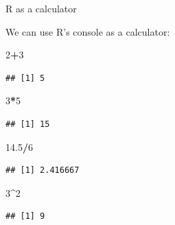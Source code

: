 \documentclass[ignorenonframetext,]{beamer}
\newenvironment{Shaded}{\begin{snugshade}}{\end{snugshade}}
\newcommand{\DecValTok}[1]{\textcolor[rgb]{0.00,0.00,0.81}{#1}}
\newcommand{\FloatTok}[1]{\textcolor[rgb]{0.00,0.00,0.81}{#1}}
\newcommand{\OperatorTok}[1]{\textcolor[rgb]{0.81,0.36,0.00}{\textbf{#1}}}
\begin{document}
\begin{frame}[fragile]{R as a calculator}
\protect\hypertarget{r-as-a-calculator}{}

We can use R's console as a calculator:

\begin{Shaded}
\begin{Highlighting}[]
\DecValTok{2}\OperatorTok{+}\DecValTok{3} 
\end{Highlighting}
\end{Shaded}

\begin{verbatim}
## [1] 5
\end{verbatim}

\begin{Shaded}
\begin{Highlighting}[]
\DecValTok{3}\OperatorTok{*}\DecValTok{5}
\end{Highlighting}
\end{Shaded}

\begin{verbatim}
## [1] 15
\end{verbatim}

\begin{Shaded}
\begin{Highlighting}[]
\FloatTok{14.5}\OperatorTok{/}\DecValTok{6}
\end{Highlighting}
\end{Shaded}

\begin{verbatim}
## [1] 2.416667
\end{verbatim}

\begin{Shaded}
\begin{Highlighting}[]
\DecValTok{3}\OperatorTok{^}\DecValTok{2}
\end{Highlighting}
\end{Shaded}

\begin{verbatim}
## [1] 9
\end{verbatim}

\end{frame}
\end{document}
